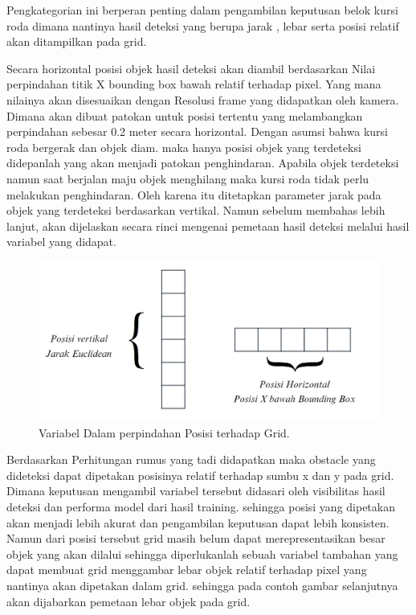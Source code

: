 Pengkategorian ini berperan penting dalam pengambilan keputusan belok kursi roda dimana nantinya hasil deteksi yang berupa jarak , lebar serta posisi relatif akan ditampilkan pada grid.

Secara horizontal posisi objek hasil deteksi akan diambil berdasarkan Nilai perpindahan titik X bounding box bawah relatif terhadap pixel. Yang mana nilainya akan disesuaikan dengan Resolusi frame yang didapatkan oleh kamera. Dimana akan dibuat patokan untuk posisi tertentu yang melambangkan perpindahan sebesar 0.2 meter secara horizontal.  Dengan asumsi bahwa kursi roda bergerak dan objek diam. maka hanya posisi objek yang terdeteksi didepanlah yang akan menjadi patokan penghindaran. Apabila objek terdeteksi namun saat berjalan maju objek menghilang maka kursi roda tidak perlu melakukan penghindaran. Oleh karena itu ditetapkan parameter jarak pada objek yang terdeteksi berdasarkan vertikal. Namun sebelum membahas lebih lanjut, akan dijelaskan secara rinci mengenai pemetaan hasil deteksi melalui hasil variabel yang didapat.

\begin{figure}[H]
  \centering
  \includegraphics[scale=0.3]{gambar/posisi.jpg}
  \caption{Variabel Dalam perpindahan Posisi terhadap Grid.}
  \label{fig:Kategori Posisi berdasarkan index.}
\end{figure}

Berdasarkan Perhitungan rumus yang tadi didapatkan maka obstacle yang dideteksi dapat dipetakan posisinya relatif terhadap sumbu x dan y pada grid. Dimana keputusan mengambil variabel tersebut didasari oleh visibilitas hasil deteksi dan performa model dari hasil training. sehingga posisi yang dipetakan akan menjadi lebih akurat dan pengambilan keputusan dapat lebih konsisten. Namun dari posisi tersebut grid masih belum dapat merepresentasikan besar objek yang akan dilalui sehingga diperlukanlah sebuah variabel tambahan yang dapat membuat grid menggambar lebar objek relatif terhadap pixel yang nantinya akan dipetakan dalam grid. sehingga pada contoh gambar selanjutnya akan dijabarkan pemetaan lebar objek pada grid.

